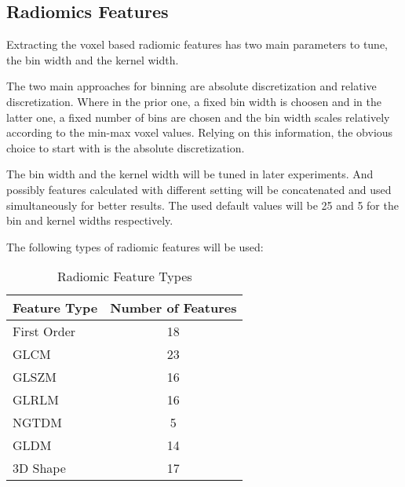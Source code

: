 \subsection{Radiomics Features}
Extracting the voxel based radiomic features has two main parameters to tune, the bin width and the kernel width.\par
The two main approaches for binning are absolute discretization and relative discretization. Where in the prior one, a fixed bin width is choosen and in the latter one, a fixed number of bins are chosen and the bin width scales relatively according to the min-max voxel values.  Relying on this information, the obvious choice to start with is the absolute discretization.\par
The bin width and the kernel width will be tuned in later experiments. And possibly features calculated with different setting will be concatenated and used simultaneously for better results. The used default values will be 25 and 5 for the bin and kernel widths respectively.\par
The following types of radiomic features will be used:
\begin{table}[H]
\centering
\begin{tabular}{|l|c|}
\hline
\textbf{Feature Type} & \textbf{Number of Features} \\ \hline
First Order & 18 \\ \hline
\ac{GLCM} & 23 \\ \hline
\ac{GLSZM} & 16 \\ \hline
\ac{GLRLM} & 16 \\ \hline
\ac{NGTDM} & 5 \\ \hline
\ac{GLDM} & 14 \\ \hline
3D Shape & 17 \\ \hline
\end{tabular}
\caption{Radiomic Feature Types}
\label{tab:radf0}
\end{table}

